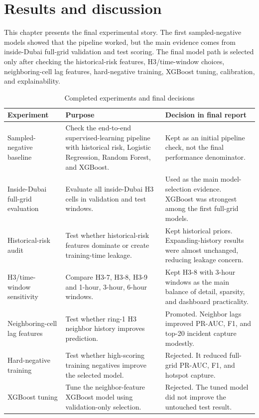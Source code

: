 \chapter{Results and discussion}

This chapter presents the final experimental story. The first sampled-negative models showed that the pipeline worked, but the main evidence comes from inside-Dubai full-grid validation and test scoring. The final model path is selected only after checking the historical-risk features, H3/time-window choices, neighboring-cell lag features, hard-negative training, XGBoost tuning, calibration, and explainability.

\begin{table}[H]
\centering
\caption{Completed experiments and final decisions}
\label{tab:completed_experiments_decisions}
\footnotesize
\begin{tabularx}{\textwidth}{L{0.28\textwidth}L{0.30\textwidth}Y}
\toprule
\textbf{Experiment} & \textbf{Purpose} & \textbf{Decision in final report} \\
\midrule
Sampled-negative baseline & Check the end-to-end supervised-learning pipeline with historical risk, Logistic Regression, Random Forest, and XGBoost. & Kept as an initial pipeline check, not the final performance denominator. \\
Inside-Dubai full-grid evaluation & Evaluate all inside-Dubai H3 cells in validation and test windows. & Used as the main model-selection evidence. XGBoost was strongest among the first full-grid models. \\
Historical-risk audit & Test whether historical-risk features dominate or create training-time leakage. & Kept historical priors. Expanding-history results were almost unchanged, reducing leakage concern. \\
H3/time-window sensitivity & Compare H3-7, H3-8, H3-9 and 1-hour, 3-hour, 6-hour windows. & Kept H3-8 with 3-hour windows as the main balance of detail, sparsity, and dashboard practicality. \\
Neighboring-cell lag features & Test whether ring-1 H3 neighbor history improves prediction. & Promoted. Neighbor lags improved PR-AUC, F1, and top-20 incident capture modestly. \\
Hard-negative training & Test whether high-scoring training negatives improve the selected model. & Rejected. It reduced full-grid PR-AUC, F1, and hotspot capture. \\
XGBoost tuning & Tune the neighbor-feature XGBoost model using validation-only selection. & Rejected. The tuned model did not improve the untouched test result. \\

\end{tabularx}
\end{table}
